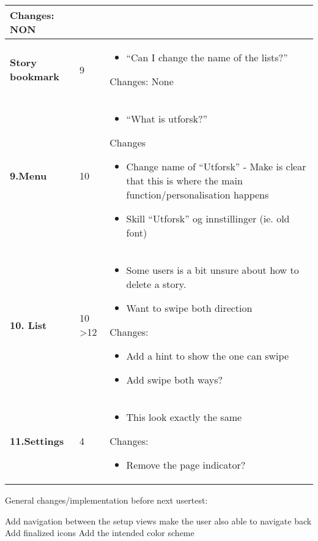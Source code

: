\begin{center}
\begin{longtable}{ | p{4cm} | p{3cm} | p{9cm}|}
					
					Changes:
					NON
					\\\hline
					\textbf{Story bookmark} & 9  & 
					\begin{itemize}
						\item “Can I change the name of the lists?”
					\end{itemize}
					
					Changes: None	
					\\\hline
					\textbf{9.Menu} & 10  &
					\begin{itemize}
						\item “What is utforsk?” 
					\end{itemize}
					Changes
					\begin{itemize}
						\item Change name of “Utforsk” - Make is clear that this is where the main function/personalisation happens  		 	
						\item Skill “Utforsk” og innstillinger (ie. old font)
					\end{itemize}			
					\\\hline
					\textbf{10. List} & 10 \textgreater 12 &
					\begin{itemize}
						\item Some users is a bit unsure about how to delete a story.
						\item Want to swipe both direction
					\end{itemize} 
					
					Changes:
					\begin{itemize}
						\item Add a hint to show the one can swipe
						\item 	Add swipe both ways?
					\end{itemize}
					
					\\\hline
					\textbf{11.Settings} & 4   & 
					\begin{itemize}
						\item This look exactly the same
					\end{itemize}
					Changes: 
					\begin{itemize}
						\item Remove the page indicator?
					\end{itemize}
					\\ \hline
				\end{longtable}
			\end{center}
			
			General changes/implementation before next usertest:
			
			Add navigation between the setup views make the user also able to navigate back 
			Add finalized icons
			Add the intended color scheme 
			
			
			\cleardoublepage
